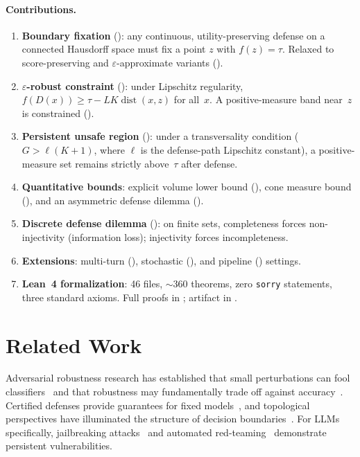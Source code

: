 \documentclass[11pt]{article}
\newcommand{\dist}{\operatorname{dist}}
\begin{document}
\paragraph{Contributions.}
\begin{enumerate}[nosep]
  \item \textbf{Boundary fixation} (): any continuous,
    utility-preserving defense on a connected Hausdorff space must fix
    a point $z$ with $f(z) = \tau$. Relaxed to score-preserving and
    $\varepsilon$-approximate variants
    ().
  \item \textbf{$\varepsilon$-robust constraint} ():
    under Lipschitz regularity, $f(D(x)) \geq \tau - LK\dist(x,z)$
    for all~$x$. A positive-measure band near~$z$ is constrained
    ().
  \item \textbf{Persistent unsafe region} ():
    under a transversality condition ($G > \ell(K+1)$, where $\ell$ is
    the defense-path Lipschitz constant), a positive-measure set
    remains strictly above~$\tau$ after defense.
  \item \textbf{Quantitative bounds}: explicit volume lower bound
    (), cone measure bound (), and
    an asymmetric defense dilemma ().
  \item \textbf{Discrete defense dilemma} ():
    on finite sets, completeness forces non-injectivity (information
    loss); injectivity forces incompleteness.
  \item \textbf{Extensions}: multi-turn (),
    stochastic (), and pipeline
    () settings.
  \item \textbf{Lean~4 formalization}: 46 files, ${\sim}360$ theorems,
    zero \texttt{sorry} statements, three standard axioms. Full proofs
    in ; artifact in .
\end{enumerate}


\section{Related Work}
\label{sec:related}

Adversarial robustness research has established that small
perturbations can fool classifiers~\cite{szegedy2013intriguing,
goodfellow2014explaining,carlini2017evaluating,madry2018towards} and
that robustness may fundamentally trade off against
accuracy~\cite{tsipras2018robustness,fawzi2018adversarial}. Certified
defenses provide guarantees for fixed
models~\cite{cohen2019certified,katz2017reluplex,singh2019abstract,
huang2017safety,bagnall2019certifying}, and topological perspectives
have illuminated the structure of decision
boundaries~\cite{naitzat2020topology}. For LLMs specifically,
jailbreaking attacks~\cite{zou2023universal,chao2024jailbreaking,
mehrotra2024tree,greshake2023indirect} and automated
red-teaming~\cite{mouret2015illuminating,samvelyan2024rainbow}
demonstrate persistent vulnerabilities.
\end{document}

